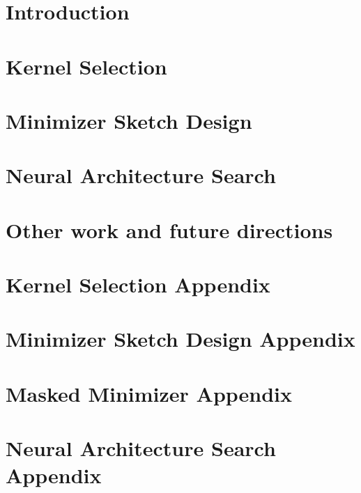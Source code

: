 \documentclass[11pt]{cmuthesis}
\begin{document}
\chapter{Introduction}

\label{sec:intro}

\chapter{Kernel Selection}

\label{sec:kernel}

\chapter{Minimizer Sketch Design}

\label{sec:minimizer}

\chapter{Neural Architecture Search}

\label{sec:nas}

\chapter{Other work and future directions}
\label{sec:future}


% 

\appendix

\chapter{Kernel Selection Appendix}

\chapter{Minimizer Sketch Design Appendix}

\chapter{Masked Minimizer Appendix}

\chapter{Neural Architecture Search Appendix}

\backmatter


\renewcommand{\bibsection}{\chapter{\bibname}}

\end{document}
